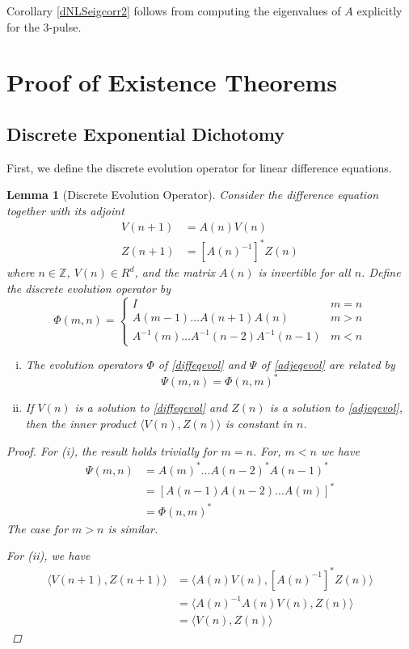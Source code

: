 \documentclass[12pt]{article}
\def\Z{{\mathbb Z}}
\newtheorem{lemma}{Lemma}
\begin{document}
Corollary \ref{dNLSeigcorr2} follows from computing the eigenvalues of $A$ explicitly for the 3-pulse. 

\section{Proof of Existence Theorems}

\subsection{Discrete Exponential Dichotomy}

First, we define the discrete evolution operator for linear difference equations.

\begin{lemma}[Discrete Evolution Operator]\label{evolop}
Consider the difference equation together with its adjoint
\begin{align}
V(n+1) &= A(n) V(n) \label{diffeqevol} \\
Z(n+1) &= [A(n)^{-1}]^* Z(n) \label{adjeqevol}
\end{align}
where $n \in \Z$, $V(n) \in R^d$, and the matrix $A(n)$ is invertible for all $n$. Define the discrete evolution operator by
\begin{equation}\label{evol}
\Phi(m, n) = 
\begin{cases}
I & m = n \\
A(m-1) \dots A(n+1) A(n) & m > n \\
A^{-1}(m) \dots A^{-1}(n-2) A^{-1}(n-1) & m < n
\end{cases}
\end{equation}
\begin{enumerate}[(i)]
\item The evolution operators $\Phi$ of \eqref{diffeqevol} and $\Psi$ of \eqref{adjeqevol} are related by
\begin{equation}\label{adjevol}
\Psi(m, n) = \Phi(n, m)^*
\end{equation}
\item If $V(n)$ is a solution to \eqref{diffeqevol} and $Z(n)$ is a solution to \eqref{adjeqevol}, then the inner product $\langle V(n), Z(n) \rangle$ is constant in $n$.
\end{enumerate}

\begin{proof}
For (i), the result holds trivially for $m = n$. For, $m < n$ we have
\begin{align*}
\Psi(m, n) &= A(m)^* \dots A(n-2)^* A(n-1)^* \\
&= [A(n-1) A(n-2) \dots A(m)]^* \\
&= \Phi(n, m)^*
\end{align*}
The case for $m > n$ is similar.

For (ii), we have
\begin{align*}
\langle V(n+1), Z(n+1) \rangle &= 
\langle A(n) V(n), [A(n)^{-1}]^* Z(n) \rangle \\
&= \langle A(n)^{-1} A(n) V(n), Z(n) \rangle \\
&= \langle V(n), Z(n) \rangle
\end{align*}
\end{proof}
\end{lemma}
\end{document}
